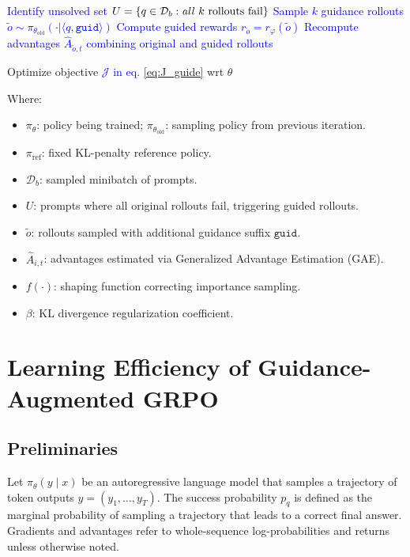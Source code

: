 \documentclass{article}
\begin{document}
{\begin{algorithm}[H]
\begin{algorithmic}[1]
    \State \textcolor{blue}{Identify unsolved set $U=\{q\in\mathcal D_b: \text{\emph{all} }k\text{ rollouts fail}\}$}
        \State \textcolor{blue}{Sample $k$ guidance rollouts $\tilde{o} \sim \pi_{\theta_\text{old}}(\cdot|\langle q, \texttt{guid}\rangle)$}
        \State \textcolor{blue}{Compute guided rewards $r_{\tilde{o}}=r_\varphi(\tilde{o})$}
        \State \textcolor{blue}{Recompute advantages $\hat{A}_{\tilde{o},t}$ combining original and guided rollouts}
    \EndFor

    \State Optimize objective \textcolor{blue}{$\mathcal{J}$ in eq. \ref{eq:J_guide}} wrt $\theta$
\EndFor
\end{algorithmic}
\end{algorithm}

Where:
\begin{itemize}
    \item $\pi_\theta$: policy being trained; $\pi_{\theta_\text{old}}$: sampling policy from previous iteration.
    \item $\pi_{\text{ref}}$: fixed KL-penalty reference policy.
    \item $\mathcal{D}_b$: sampled minibatch of prompts.
    \item $U$: prompts where all original rollouts fail, triggering guided rollouts.
    \item $\tilde{o}$: rollouts sampled with additional guidance suffix $\texttt{guid}$.
    \item $\hat{A}_{i,t}$: advantages estimated via Generalized Advantage Estimation (GAE).
    \item $f(\cdot)$: shaping function correcting importance sampling.
    \item $\beta$: KL divergence regularization coefficient.
\end{itemize}
\newpage

\section{Learning Efficiency of Guidance-Augmented GRPO}
\label{app:guide-theory}

\subsection{Preliminaries}
Let $\pi_\theta(y \mid x)$ be an autoregressive language model that samples a trajectory of token outputs $y = (y_1, \dots, y_T)$. The success probability $p_q$ is defined as the marginal probability of sampling a trajectory that leads to a correct final answer. Gradients and advantages refer to whole-sequence log-probabilities and returns unless otherwise noted.

}
\end{document}

